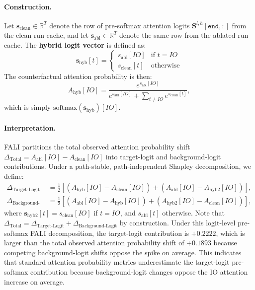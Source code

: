 \documentclass[12pt,a4paper]{article}
\begin{document}
\paragraph{Construction.} Let $\mathbf{s}_\text{clean} \in \mathbb{R}^T$
denote the row of pre-softmax attention logits
$\mathbf{S}^{l,h}[\texttt{end}, :]$ from the clean-run cache, and let
$\mathbf{s}_\text{abl} \in \mathbb{R}^T$ denote the same row from the
ablated-run cache. The \textbf{hybrid logit vector} is defined as:
\begin{equation}
  \mathbf{s}_\text{hyb}[t] =
  \begin{cases}
    s_\text{abl}[IO] & \text{if } t = IO \\
    s_\text{clean}[t] & \text{otherwise}
  \end{cases}
  \label{eq:hybrid}
\end{equation}
The counterfactual attention probability is then:
\begin{equation}
  A_\text{hyb}[IO] = \frac{e^{s_\text{abl}[IO]}}{\displaystyle e^{s_\text{abl}[IO]} + \sum_{t \neq IO} e^{s_\text{clean}[t]}},
  \label{eq:hybridattn}
\end{equation}
which is simply $\text{softmax}(\mathbf{s}_\text{hyb})[IO]$.\paragraph{Interpretation.} FALI partitions the total observed attention probability shift
$\Delta_\text{Total} = A_\text{abl}[IO] - A_\text{clean}[IO]$ into target-logit and background-logit contributions. Under a path-stable, path-independent Shapley decomposition, we define:
\begin{align}
  \Delta_\text{Target-Logit} &= \frac{1}{2} \left[ \left( A_\text{hyb}[IO] - A_\text{clean}[IO] \right) + \left( A_\text{abl}[IO] - A_\text{hyb2}[IO] \right) \right], \label{eq:target_logit_contrib} \\
  \Delta_\text{Background-Logit} &= \frac{1}{2} \left[ \left( A_\text{abl}[IO] - A_\text{hyb}[IO] \right) + \left( A_\text{hyb2}[IO] - A_\text{clean}[IO] \right) \right],
  \label{eq:background_logit_contrib}
\end{align}
where $\mathbf{s}_\text{hyb2}[t] = s_\text{clean}[IO]$ if $t = IO$, and $s_\text{abl}[t]$ otherwise. Note that $\Delta_\text{Total} = \Delta_\text{Target-Logit} + \Delta_\text{Background-Logit}$ by construction. Under this logit-level pre-softmax FALI decomposition, the target-logit contribution is $+0.2222$, which is larger than the total observed attention probability shift of $+0.1893$ because competing background-logit shifts oppose the spike on average. This indicates that standard attention probability metrics underestimate the target-logit pre-softmax contribution because background-logit changes oppose the IO attention increase on average.
\end{document}
